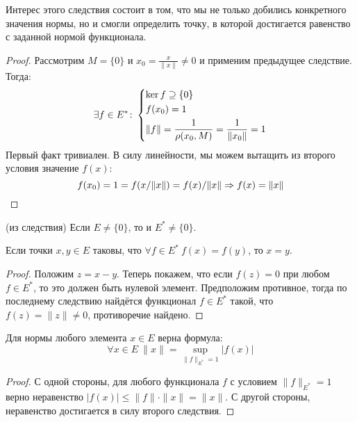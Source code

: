 \begin{anote}
	Интерес этого следствия состоит в том, что мы не только добились конкретного значения нормы, но и смогли определить точку, в которой достигается равенство с заданной нормой функционала.
\end{anote}

\begin{proof}
	Рассмотрим $M = \{0\}$ и $x_0 = \frac{x}{\|x\|} \neq 0$ и применим предыдущее следствие. Тогда:
	\[
		\exists f \in E^* \colon \left\{ \begin{aligned} 
			&{\ker f \supseteq \{0\}}
			\\
			&{f(x_0) = 1}
			\\
			&{\|f\| = \frac{1}{\rho(x_0, M)} = \frac{1}{\|x_0\|} = 1}
		 \end{aligned} \right.
	\]
	Первый факт тривиален. В силу линейности, мы можем вытащить из второго условия значение $f(x)$:
	\[
		f(x_0) = 1 = f(x / \|x\|) = f(x) / \|x\| \Rightarrow f(x) = \|x\|
	\]
\end{proof}

\begin{corollary} (из следствия)
	Если $E \neq \{0\}$, то и $E^* \neq \{0\}$.
\end{corollary}

\begin{corollary}
	Если точки $x, y \in E$ таковы, что $\forall f \in E^*\ f(x) = f(y)$, то $x = y$.
\end{corollary}

\begin{proof}
	Положим $z = x - y$. Теперь покажем, что если $f(z) = 0$ при любом $f \in E^*$, то это должен быть нулевой элемент. Предположим противное, тогда по последнему следствию найдётся функционал $f \in E^*$ такой, что $f(z) = \|z\| \neq 0$, противоречие найдено.
\end{proof}

\begin{corollary}
	Для нормы любого элемента $x \in E$ верна формула:
	\[
		\forall x \in E\ \|x\| = \sup_{\|f\|_{E^*} =  1} |f(x)|
	\]
\end{corollary}

\begin{proof}
	С одной стороны, для любого функционала $f$ с условием $\|f\|_{E^*} = 1$ верно неравенство $|f(x)| \le \|f\| \cdot \|x\| = \|x\|$. С другой стороны, неравенство достигается в силу второго следствия.
\end{proof}

